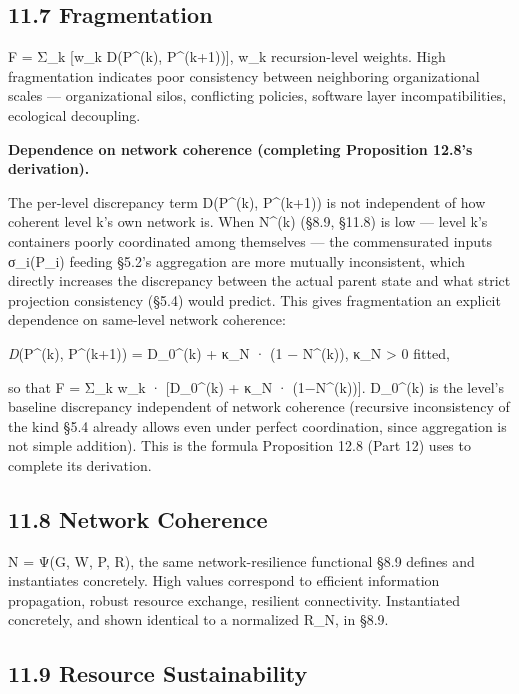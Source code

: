 \documentclass[
]{article}
\begin{document}
\hypertarget{fragmentation}{%
\subsection{11.7 Fragmentation}\label{fragmentation}}

F = Σ\_k {[}w\_k D(P\^{}(k), P\^{}(k+1)){]}, w\_k recursion-level
weights. High fragmentation indicates poor consistency between
neighboring organizational scales --- organizational silos, conflicting
policies, software layer incompatibilities, ecological decoupling.

\textbf{Dependence on network coherence (completing Proposition 12.8's
derivation).}

The per-level discrepancy term D(P\^{}(k), P\^{}(k+1)) is not
independent of how coherent level k's own network is. When N\^{}(k)
(§8.9, §11.8) is low --- level k's containers poorly coordinated among
themselves --- the commensurated inputs σ\_i(P\_i) feeding §5.2's
aggregation are more mutually inconsistent, which directly increases the
discrepancy between the actual parent state and what strict projection
consistency (§5.4) would predict. This gives fragmentation an explicit
dependence on same-level network coherence:

\emph{D}(P\^{}(k), P\^{}(k+1)) = D\_0\^{}(k) + κ\_N · (1 − N\^{}(k)),
κ\_N \textgreater{} 0 fitted,

so that F = Σ\_k w\_k · {[}D\_0\^{}(k) + κ\_N · (1−N\^{}(k)){]}.
D\_0\^{}(k) is the level's baseline discrepancy independent of network
coherence (recursive inconsistency of the kind §5.4 already allows even
under perfect coordination, since aggregation is not simple addition).
This is the formula Proposition 12.8 (Part 12) uses to complete its
derivation.

\hypertarget{network-coherence}{%
\subsection{11.8 Network Coherence}\label{network-coherence}}

N = Ψ(G, W, P, R), the same network-resilience functional §8.9 defines
and instantiates concretely. High values correspond to efficient
information propagation, robust resource exchange, resilient
connectivity. Instantiated concretely, and shown identical to a
normalized R\_N, in §8.9.

\hypertarget{resource-sustainability}{%
\subsection{11.9 Resource
Sustainability}\label{resource-sustainability}}
\end{document}
